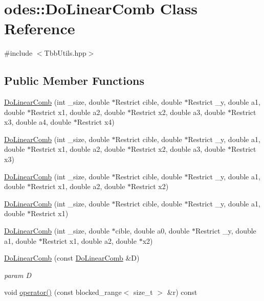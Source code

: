\hypertarget{classodes_1_1DoLinearComb}{\section{odes\-:\-:Do\-Linear\-Comb Class Reference}
\label{classodes_1_1DoLinearComb}
}


{\ttfamily \#include $<$Tbb\-Utils.\-hpp$>$}

\subsection*{Public Member Functions}
\begin{DoxyCompactItemize}
\item 
\hyperlink{classodes_1_1DoLinearComb_a8ecabd9cdebebd5f3ef869303c956253}{Do\-Linear\-Comb} (int \-\_\-size, double $\ast$Restrict cible, double $\ast$Restrict \-\_\-y, double a1, double $\ast$Restrict x1, double a2, double $\ast$Restrict x2, double a3, double $\ast$Restrict x3, double a4, double $\ast$Restrict x4)
\item 
\hyperlink{classodes_1_1DoLinearComb_ab3fa21cee3ac7fc00113b71d69ca76a3}{Do\-Linear\-Comb} (int \-\_\-size, double $\ast$Restrict cible, double $\ast$Restrict \-\_\-y, double a1, double $\ast$Restrict x1, double a2, double $\ast$Restrict x2, double a3, double $\ast$Restrict x3)
\item 
\hyperlink{classodes_1_1DoLinearComb_ac4e35004eb6c34517b3283fa5175d824}{Do\-Linear\-Comb} (int \-\_\-size, double $\ast$Restrict cible, double $\ast$Restrict \-\_\-y, double a1, double $\ast$Restrict x1, double a2, double $\ast$Restrict x2)
\item 
\hyperlink{classodes_1_1DoLinearComb_aa647ba6ec2b96f87c151a607e4c757fa}{Do\-Linear\-Comb} (int \-\_\-size, double $\ast$Restrict cible, double $\ast$Restrict \-\_\-y, double a1, double $\ast$Restrict x1)
\item 
\hyperlink{classodes_1_1DoLinearComb_a52645777917ddf452424311ad48a4964}{Do\-Linear\-Comb} (int \-\_\-size, double $\ast$cible, double a0, double $\ast$Restrict \-\_\-y, double a1, double $\ast$Restrict x1, double a2, double $\ast$x2)
\item 
\hyperlink{classodes_1_1DoLinearComb_a310e93696dc566bd1e5c52be4f2ae7d1}{Do\-Linear\-Comb} (const \hyperlink{classodes_1_1DoLinearComb}{Do\-Linear\-Comb} \&D)
\begin{DoxyCompactList}\small\item\em param D \end{DoxyCompactList}\item 
void \hyperlink{classodes_1_1DoLinearComb_ac1520ee3f407eb901cfe6928211cc723}{operator()} (const blocked\-\_\-range$<$ size\-\_\-t $>$ \&r) const 
\end{DoxyCompactItemize}
